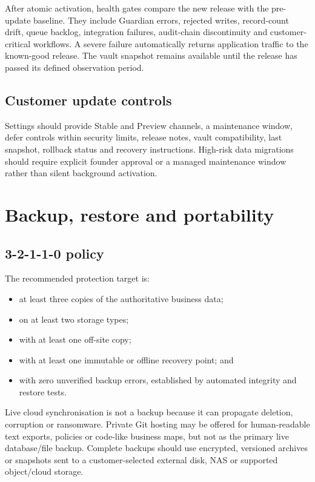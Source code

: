 \documentclass[11pt]{article}
\begin{document}
After atomic activation, health gates compare the new release with the pre-update baseline. They include Guardian errors, rejected writes, record-count drift, queue backlog, integration failures, audit-chain discontinuity and customer-critical workflows. A severe failure automatically returns application traffic to the known-good release. The vault snapshot remains available until the release has passed its defined observation period.

\subsection{Customer update controls}

Settings should provide Stable and Preview channels, a maintenance window, defer controls within security limits, release notes, vault compatibility, last snapshot, rollback status and recovery instructions. High-risk data migrations should require explicit founder approval or a managed maintenance window rather than silent background activation.

\section{Backup, restore and portability}

\subsection{3-2-1-1-0 policy}

The recommended protection target is:

\begin{itemize}
  \item at least three copies of the authoritative business data;
  \item on at least two storage types;
  \item with at least one off-site copy;
  \item with at least one immutable or offline recovery point; and
  \item with zero unverified backup errors, established by automated integrity and restore tests.
\end{itemize}

Live cloud synchronisation is not a backup because it can propagate deletion, corruption or ransomware. Private Git hosting may be offered for human-readable text exports, policies or code-like business maps, but not as the primary live database/file backup. Complete backups should use encrypted, versioned archives or snapshots sent to a customer-selected external disk, NAS or supported object/cloud storage.
\end{document}

